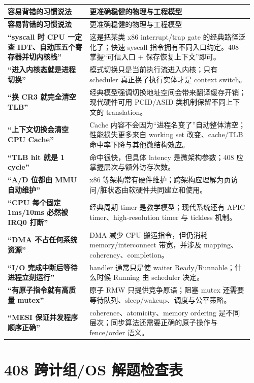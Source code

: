\documentclass[11pt,a4paper]{ctexart}
\begin{document}
\begingroup
\small
\renewcommand{\arraystretch}{1.25}
\begin{longtable}{>{\bfseries}p{0.32\linewidth} p{0.64\linewidth}}
\toprule
容易背错的习惯说法 & 更准确稳健的物理与工程模型\\
\midrule
\endfirsthead
\toprule
容易背错的习惯说法 & 更准确稳健的物理与工程模型\\
\midrule
\endhead
“syscall 时 CPU 一定查 IDT、自动压五个寄存器并切内核栈” & 这是把某类 x86 interrupt/trap gate 的经典路径泛化了；快速 syscall 指令拥有不同入口约定。408 掌握“可信入口 + 保存恢复上下文”即可。\\
“进入内核态就是进程切换” & 模式切换只是当前执行流进入内核；只有 scheduler 真正换了执行实体才是 context switch。\\
“换 CR3 就完全清空 TLB” & 经典模型强调切换地址空间会带来翻译缓存开销；现代硬件可用 PCID/ASID 类机制保留不同上下文的 translation。\\
“上下文切换会清空 CPU Cache” & Cache 内容不会因为“进程名变了”自动整体清空；性能损失更多来自 working set 改变、cache/TLB 命中率下降与其他微结构效应。\\
“TLB hit 就是 1 cycle” & 命中很快，但具体 latency 是微架构参数；408 应掌握层次与额外访存次数。\\
“A/D 位都由 MMU 自动维护” & x86 等架构常有硬件维护；跨架构应理解为页访问/脏状态由软硬件共同建立和使用。\\
“CPU 每个固定 1ms/10ms 必然被 IRQ0 打断” & 经典周期 timer 是教学模型；现代系统还有 APIC timer、high-resolution timer 与 tickless 机制。\\
“DMA 不占任何系统资源” & DMA 减少 CPU 搬运指令，但仍消耗 memory/interconnect 带宽，并涉及 mapping、coherency、completion。\\
“I/O 完成中断后等待进程立刻运行” & handler 通常只是使 waiter Ready/Runnable；什么时候 Running 由 scheduler 决定。\\
“有原子指令就有高质量 mutex” & 原子 RMW 只提供竞争原语；阻塞 mutex 还需要等待队列、sleep/wakeup、调度与公平策略。\\
“MESI 保证并发程序顺序正确” & coherence、atomicity、memory ordering 是不同层次；同步算法还需要正确的原子操作与 fence/order 语义。\\
\bottomrule
\end{longtable}
\endgroup

\section{408 跨计组/OS 解题检查表}
\end{document}
